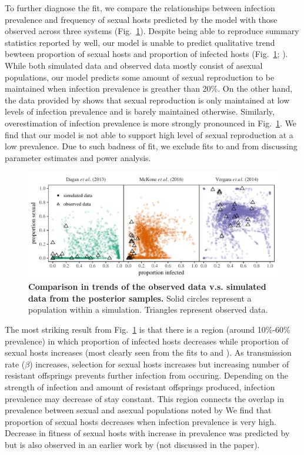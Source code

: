 \documentclass{article}\usepackage[]{graphicx}\usepackage[]{color}
\newcommand{\fref}[1]{Fig.~\ref{fig:#1}}
\begin{document}
To further diagnose the fit, we compare the relationships between infection prevalence and frequency of sexual hosts predicted by the model with those observed across three systems (\fref{ivs}).
Despite being able to reproduce summary statistics reported by \cite{dagan2013clonal} well, 
our model is unable to predict qualitative trend bewteen proportion of sexual hosts and proportion of infected hosts (\fref{ivs}; \cite{dagan2013clonal}).
While both simulated data and observed data mostly consist of asexual populations,
our model predicts some amount of sexual reproduction to be maintained when infection prevalence is greather than 20\%. 
On the other hand, the data provided by \cite{dagan2013clonal} shows that sexual reproduction is only maintained at low levels of infection prevalence and is barely maintained otherwise.
Similarly, overestimation of infection prevalence is more strongly pronounced in \fref{ivs}.
We find that our model is not able to support high level of sexual reproduction at a low prevalence.
Due to such badness of fit, we exclude fits to \cite{dagan2013clonal} and \cite{mckone2016fine} from discussing parameter estimates and power analysis.

\begin{figure}[!ht]
\includegraphics[width=\textwidth]{../fig/simulated_data.pdf}
\caption{{\bf Comparison in trends of the observed data v.s. simulated data from the posterior samples.}
Solid circles represent a population within a simulation. Triangles represent observed data.}
\label{fig:ivs}
\end{figure}

The most striking result from \fref{ivs} is that there is a region (around 10\%-60\% prevalence) in which proportion of infected hosts decreases while proportion of sexual hosts increases (most clearly seen from the fits to \cite{mckone2016fine} and \cite{vergara2014infection}).
As transmission rate ($\beta$) increases, selection for sexual hosts increases but increasing number of resistant offsprings prevents further infection from occuring. 
Depending on the strength of infection and amount of resistant offsprings produced, infection prevalence may decrease of stay constant.
This region connects the overlap in prevalence between sexual and asexual populations noted by \cite{lively2001trematode}
We find that proportion of sexual hosts decreases when infection prevalence is very high.
Decrease in fitness of sexual hosts with increase in prevalence was predicted by \cite{ashby2015diversity} but is also observed in an earlier work by \cite{lively2010epidemiological} (not discussed in the paper).
\end{document}
